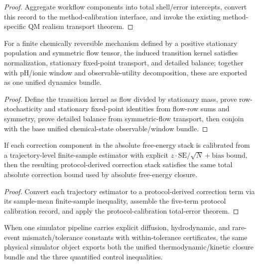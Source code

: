 \begin{proof}
Aggregate workflow components into total shell/error intercepts, convert this record to the method-calibration interface, and invoke the existing method-specific QM realism transport theorem.
\end{proof}

\begin{theorem}\label{thm:reversible-chemical-transition-detailed-balance-bundle}
For a finite chemically reversible mechanism defined by a positive stationary population and symmetric flow tensor, the induced transition kernel satisfies normalization, stationary fixed-point transport, and detailed balance; together with pH/ionic window and observable-utility decomposition, these are exported as one unified dynamics bundle.
\end{theorem}

\begin{proof}
Define the transition kernel as flow divided by stationary mass, prove row-stochasticity and stationary fixed-point identities from flow-row sums and symmetry, prove detailed balance from symmetric-flow transport, then conjoin with the base unified chemical-state observable/window bundle.
\end{proof}

\begin{theorem}\label{thm:trajectory-absolute-free-energy-correction-closure}
If each correction component in the absolute free-energy stack is calibrated from a trajectory-level finite-sample estimator with explicit $z\cdot\mathrm{SE}/\sqrt{N}+\mathrm{bias}$ bound, then the resulting protocol-derived correction stack satisfies the same total absolute correction bound used by absolute free-energy closure.
\end{theorem}

\begin{proof}
Convert each trajectory estimator to a protocol-derived correction term via its sample-mean finite-sample inequality, assemble the five-term protocol calibration record, and apply the protocol-calibration total-error theorem.
\end{proof}

\begin{theorem}\label{thm:quantified-simulator-thermo-kinetic-bundle}
When one simulator pipeline carries explicit diffusion, hydrodynamic, and rare-event mismatch/tolerance constants with within-tolerance certificates, the same physical simulator object exports both the unified thermodynamic/kinetic closure bundle and the three quantified control inequalities.
\end{theorem}

